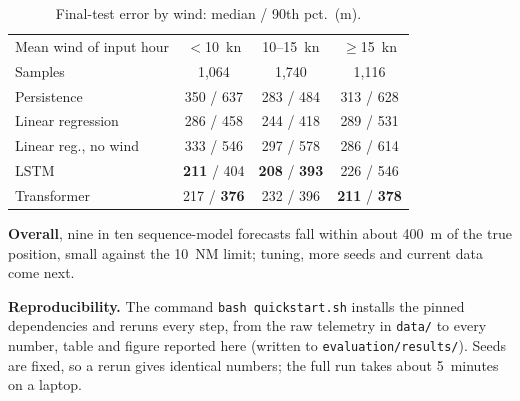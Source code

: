 \documentclass[sigconf]{acmart}
\begin{document}
\begin{table}[!ht]
\centering\footnotesize
\caption{Final-test error by wind: median / 90th pct.\ (m).}
\label{tab:wind}
\begin{tabular}{@{}lccc@{}}
\toprule
Mean wind of input hour & $<$10~kn & 10--15~kn & $\geq$15~kn \\
Samples & 1{,}064 & 1{,}740 & 1{,}116 \\
\midrule
Persistence & 350 / 637 & 283 / 484 & 313 / 628 \\
Linear regression & 286 / 458 & 244 / 418 & 289 / 531 \\
Linear reg., no wind & 333 / 546 & 297 / 578 & 286 / 614 \\
LSTM & \textbf{211} / 404 & \textbf{208} / \textbf{393} & 226 / 546 \\
Transformer & 217 / \textbf{376} & 232 / 396 & \textbf{211} / \textbf{378} \\
\bottomrule
\end{tabular}
\end{table}

\textbf{Overall}, nine in ten sequence-model forecasts fall within about 400~m of the true position, small against the 10~NM limit; tuning, more seeds and current data come next.

\textbf{Reproducibility.} The command \texttt{bash quickstart.sh} installs the pinned dependencies and reruns every step, from the raw telemetry in \texttt{data/} to every number, table and figure reported here (written to \texttt{evaluation/results/}). Seeds are fixed, so a rerun gives identical numbers; the full run takes about 5~minutes on a laptop.




\end{document}
